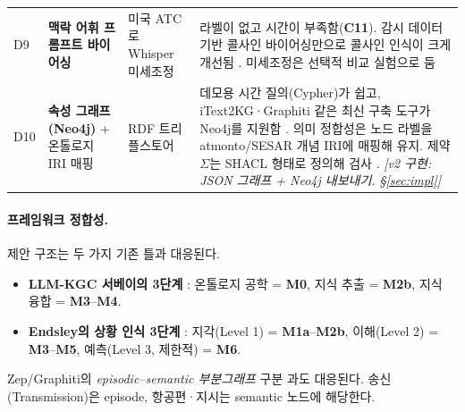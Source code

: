 \documentclass[10pt,a4paper]{article}
\newcommand{\cmd}[1]{\textsf{\small #1}}
\newcommand{\ch}[1]{\textbf{\textcolor{red!60!black}{#1}}}
\newcommand{\md}[1]{\textbf{\textcolor{blue!60!black}{#1}}}
\begin{document}
\begin{center}
\begin{tabularx}{\textwidth}{@{}l>{\raggedright\arraybackslash}p{3.1cm}>{\raggedright\arraybackslash}p{3.0cm}>{\raggedright\arraybackslash}X@{}}
D9 & \textbf{맥락 어휘 프롬프트 바이어싱} & 미국 ATC로 Whisper 미세조정 & 라벨이 없고 시간이 부족함(\ch{C11}). 감시 데이터 기반 콜사인 바이어싱만으로 콜사인 인식이 크게 개선됨 \cite{nigmatulina2022}. 미세조정은 선택적 비교 실험으로 둠 \cite{vandoorn}\\
D10 & \textbf{속성 그래프(Neo4j)} + 온톨로지 IRI 매핑 & RDF 트리플스토어 & 데모용 시간 질의(Cypher)가 쉽고, iText2KG·Graphiti 같은 최신 구축 도구가 Neo4j를 지원함 \cite{itext2kg,zep2025}. 의미 정합성은 노드 라벨을 atmonto/SESAR 개념 IRI에 매핑해 유지. 제약 $\Sigma$는 SHACL 형태로 정의해 검사 \cite{shacl}. \emph{[v2 구현: JSON 그래프 + Neo4j 내보내기. \S\ref{sec:impl}]}\\
\bottomrule
\end{tabularx}
\end{center}

\paragraph{프레임워크 정합성.}
제안 구조는 두 가지 기존 틀과 대응된다.
\begin{itemize}
\item \textbf{LLM-KGC 서베이의 3단계} \cite{llmkgc2025}: 온톨로지 공학 = \md{M0}, 지식 추출 = \md{M2b}, 지식 융합 = \md{M3}--\md{M4}.
\item \textbf{Endsley의 상황 인식 3단계} \cite{endsley1995}: 지각(Level 1) = \md{M1a}--\md{M2b}, 이해(Level 2) = \md{M3}--\md{M5}, 예측(Level 3, 제한적) = \md{M6}.
\end{itemize}
Zep/Graphiti의 \emph{episodic--semantic 부분그래프} 구분 \cite{zep2025}과도 대응된다. 송신(\cmd{Transmission})은 episode, 항공편·지시는 semantic 노드에 해당한다.

\end{document}
